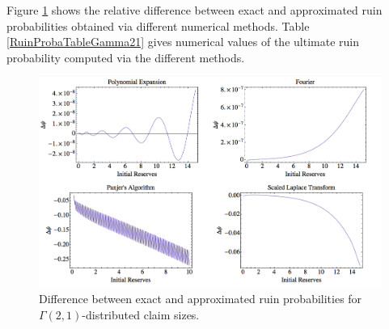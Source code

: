 Figure \ref{Gamma2CaseDifferentMethods} shows the relative difference between exact and approximated ruin probabilities obtained via different numerical methods. Table \ref{RuinProbaTableGamma21} gives numerical values of the ultimate ruin probability computed via the different methods. 
\begin{center}
	\begin{figure}[!h]
		\begin{center}
			\includegraphics[width=16cm]{Chapitre4/GraphUltimateRuinProbabilityGamma2-1Case.png}
			\caption{Difference between exact and approximated ruin probabilities for $\Gamma(2,1)$-distributed claim sizes.}\label{Gamma2CaseDifferentMethods}
		\end{center}
	\end{figure}
\end{center}

